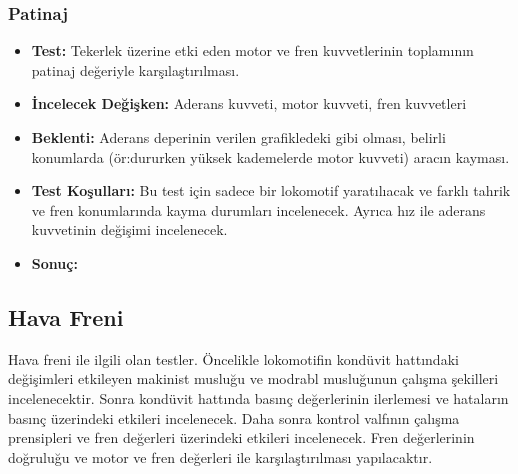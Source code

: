 \documentclass[10pt,a4paper]{article}
\begin{document}
\subsubsection{Patinaj}
\begin{itemize}
\item \textbf{Test:} Tekerlek üzerine etki eden motor ve fren kuvvetlerinin toplamının patinaj değeriyle karşılaştırılması.\\
\item \textbf{İncelecek Değişken:} Aderans kuvveti, motor kuvveti, fren kuvvetleri\\
\item \textbf{Beklenti:} Aderans deperinin verilen grafikledeki gibi olması, belirli konumlarda (ör:dururken yüksek kademelerde motor kuvveti) aracın kayması.\\
\item \textbf{Test Koşulları:} Bu test için sadece bir lokomotif yaratılıacak ve farklı tahrik ve fren konumlarında kayma durumları incelenecek. Ayrıca hız ile aderans kuvvetinin değişimi incelenecek.\\
\item \textbf{Sonuç:}
\end{itemize}

\subsection{Hava Freni}
Hava freni ile ilgili olan testler. Öncelikle lokomotifin kondüvit hattındaki değişimleri etkileyen makinist musluğu ve modrabl musluğunun çalışma şekilleri incelenecektir. Sonra kondüvit hattında basınç değerlerinin ilerlemesi ve hataların basınç üzerindeki etkileri incelenecek. Daha sonra kontrol valfının çalışma prensipleri ve fren değerleri üzerindeki etkileri incelenecek. Fren değerlerinin doğruluğu ve motor ve fren değerleri ile karşılaştırılması yapılacaktır.
\end{document}
